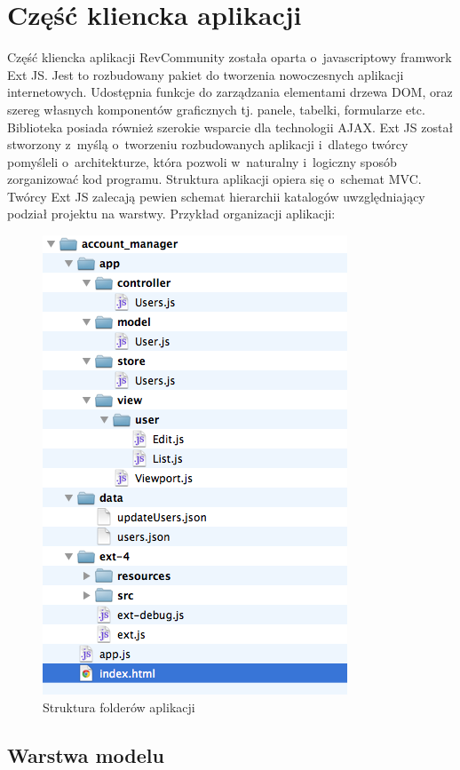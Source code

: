\chapter{Część kliencka aplikacji}

Część kliencka aplikacji RevCommunity została oparta o~javascriptowy framwork Ext JS. Jest to rozbudowany pakiet do tworzenia nowoczesnych aplikacji internetowych. Udostępnia funkcje do zarządzania elementami drzewa DOM, oraz szereg własnych komponentów graficznych tj. panele, tabelki, formularze etc. Biblioteka posiada również szerokie wsparcie dla technologii AJAX. Ext JS został stworzony z~myślą o~tworzeniu rozbudowanych aplikacji i~dlatego twórcy pomyśleli o~architekturze, która pozwoli w~naturalny i~logiczny sposób zorganizować kod programu. Struktura aplikacji opiera się o~schemat MVC. Twórcy Ext JS zalecają pewien schemat hierarchii katalogów uwzględniający podział projektu na warstwy. Przykład organizacji aplikacji:

\begin{figure}[H]
	\centering
	\includegraphics[scale=0.5]{images/struktura_folderow.png}
	\caption{Struktura folderów aplikacji}
\end{figure}

\section{Warstwa modelu}


